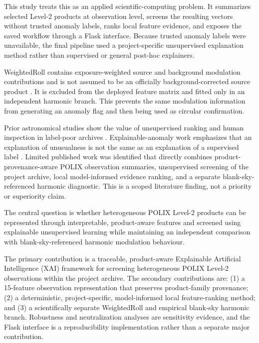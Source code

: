 \documentclass[conference]{IEEEtran}
\begin{document}
This study treats this as an applied scientific-computing problem. It summarizes selected Level-2 products at observation level, screens the resulting vectors without trusted anomaly labels, ranks local feature evidence, and exposes the saved workflow through a Flask interface. Because trusted anomaly labels were unavailable, the final pipeline used a project-specific unsupervised explanation method rather than supervised or general post-hoc explainers.

WeightedRoll contains exposure-weighted source and background modulation contributions and is not assumed to be an officially background-corrected source product \cite{polix_handbook_2025}. It is excluded from the deployed feature matrix and fitted only in an independent harmonic branch. This prevents the same modulation information from generating an anomaly flag and then being used as circular confirmation.

Prior astronomical studies show the value of unsupervised ranking and human inspection in label-poor archives \cite{baron2017weirdest,giles2019serendipity,lochner2021astronomaly}. Explainable-anomaly work emphasizes that an explanation of unusualness is not the same as an explanation of a supervised label \cite{li2024explainable_anomaly}. Limited published work was identified that directly combines product-provenance-aware POLIX observation summaries, unsupervised screening of the project archive, local model-informed evidence ranking, and a separate blank-sky-referenced harmonic diagnostic. This is a scoped literature finding, not a priority or superiority claim.

The central question is whether heterogeneous POLIX Level-2 products can be represented through interpretable, product-aware features and screened using explainable unsupervised learning while maintaining an independent comparison with blank-sky-referenced harmonic modulation behaviour.

The primary contribution is a traceable, product-aware Explainable Artificial Intelligence (XAI) framework for screening heterogeneous POLIX Level-2 observations within the project archive. The secondary contributions are: (1) a 15-feature observation representation that preserves product-family provenance; (2) a deterministic, project-specific, model-informed local feature-ranking method; and (3) a scientifically separate WeightedRoll and empirical blank-sky harmonic branch. Robustness and neutralization analyses are sensitivity evidence, and the Flask interface is a reproducibility implementation rather than a separate major contribution.
\end{document}
